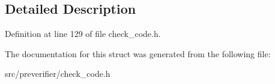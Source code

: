 \subsection{Detailed Description}


Definition at line 129 of file check\_\-code.h.



The documentation for this struct was generated from the following file:\begin{DoxyCompactItemize}
\item 
src/preverifier/check\_\-code.h\end{DoxyCompactItemize}

